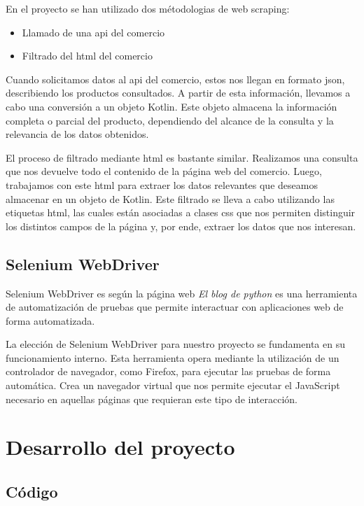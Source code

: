 \documentclass[12pt,twoside,titlepage]{report}
\begin{document}
En el proyecto se han utilizado dos métodologias de web scraping:

\begin{itemize}
	\item Llamado de una api del comercio
	\item Filtrado del html del comercio
\end{itemize}

Cuando solicitamos datos al api del comercio, estos nos llegan en formato json, describiendo los productos consultados. A partir de esta información, llevamos a cabo una conversión a un objeto Kotlin. Este objeto almacena la información completa o parcial del producto, dependiendo del alcance de la consulta y la relevancia de los datos obtenidos.

El proceso de filtrado mediante html es bastante similar. Realizamos una consulta que nos devuelve todo el contenido de la página web del comercio. Luego, trabajamos con este html para extraer los datos relevantes que deseamos almacenar en un objeto de Kotlin. Este filtrado se lleva a cabo utilizando las etiquetas html, las cuales están asociadas a clases css que nos permiten distinguir los distintos campos de la página y, por ende, extraer los datos que nos interesan.


\subsection{Selenium WebDriver}
\label{sec:Selenium}

Selenium WebDriver es según la página web \textit{El blog de python} \cite{Selenium WebDriver} es una herramienta de automatización de pruebas que permite interactuar con aplicaciones web de forma automatizada.

La elección de Selenium WebDriver para nuestro proyecto se fundamenta en su funcionamiento interno. Esta herramienta opera mediante la utilización de un controlador de navegador, como Firefox, para ejecutar las pruebas de forma automática. Crea un navegador virtual que nos permite ejecutar el JavaScript necesario en aquellas páginas que requieran este tipo de interacción.

\section{Desarrollo del proyecto}

\newpage



\subsection{Código}
\end{document}
